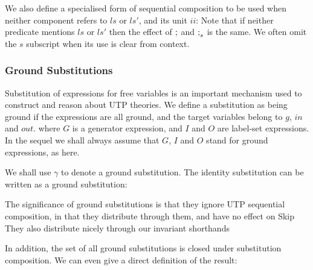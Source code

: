 We also define a specialised form of sequential composition
to be used when neither component refers to $ls$ or $ls'$,
and its unit $ii$:
Note that if neither predicate mentions $ls$ or $ls'$
then the effect of $\mathrel{;}$ and $\mathrel{;}_s$ is the same.
We often omit the $s$ subscript when its use is clear from context.


\subsubsection{Ground Substitutions}

Substitution of expressions for free variables is
an important mechanism used to construct and reason about
UTP theories.
We define a substitution as being ground if the expressions
are all ground, and the target variables belong to $g$, $in$ and $out$.
where $G$ is a generator expression,
and $I$ and $O$ are label-set expressions.
In the sequel we shall always assume that $G$, $I$ and $O$
stand for ground expressions, as here.

We shall use $\gamma$ to denote a ground substitution.
The identity substitution can be written as a ground substitution:

The significance of ground substitutions
is that they ignore UTP sequential composition,
in that they distribute through them,
and have no effect on Skip
They also distribute nicely through our invariant shorthands

In addition, the set of all ground substitutions
is closed under substitution composition.
We can even give a direct definition of the result:


